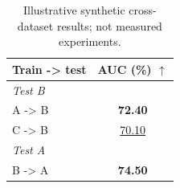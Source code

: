 \documentclass[10pt]{article}
\begin{document}
\begin{table}[t]
\centering
\caption{Illustrative synthetic cross-dataset results; not measured experiments.}
\label{tab:cross-dataset}
\begin{tabular}{@{}lc@{}}
\toprule
Train -\textgreater{} test & AUC (\%) $\uparrow$ \\
\midrule
\multicolumn{2}{l}{\textit{Test B}} \\
A -\textgreater{} B & \textbf{72.40} \\
C -\textgreater{} B & \underline{70.10} \\
\midrule
\multicolumn{2}{l}{\textit{Test A}} \\
B -\textgreater{} A & \textbf{74.50} \\
\bottomrule
\end{tabular}
\end{table}
\end{document}
